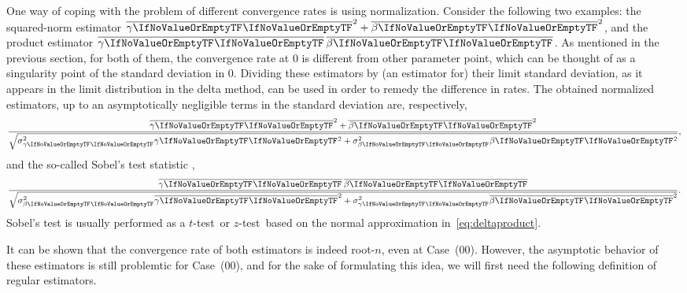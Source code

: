 \documentclass[ejs, twoside]{imsart}
\theoremstyle{plain}
\theoremstyle{remark}
\newcommand{\fullstop}{\text{.}}
\newcommand{\comma}{\text{,}}
\newcommand{\ttest}{\(t\)-test}
\newcommand{\ztest}{\(z\)-test}
\newcommand{\estim}[1]{\avg{\regcoef{#1}}}
\newcommand{\nullcase}[1]{(#1)}
\numberwithin{equation}{section}
\numberwithin{table}{section}
\numberwithin{figure}{section}
\let\originalleft\left
\let\originalright\right
\renewcommand{\left}{\mathopen{}\mathclose\bgroup\originalleft}
\renewcommand{\right}{\aftergroup\egroup\originalright}
\begin{document}
One way of coping with the problem of different convergence rates is using normalization. Consider the following two examples: the squared-norm estimator \( \estim{1}^2 + \estim{2}^2\), and the product estimator \(\product\). As mentioned in the previous section, for both of them, the convergence rate at 0 is different from other parameter point, which can be thought of as a singularity point of the standard deviation in \(0\). Dividing these estimators by (an estimator for) their limit standard deviation, as it appears in the limit distribution in the delta method, can be used in order to remedy the difference in rates.
The obtained normalized estimators, up to an asymptotically negligible terms in the standard deviation are, respectively, \[\frac{ \estim{1}^2 + \estim{2}^2}{\sqrt{\sigma_{\regcoef{1}}^2 \regcoef{1}^2 +  \sigma_{\regcoef{2}}^2 \regcoef{2}^2}} \comma\]
and
the so-called Sobel's test statistic \citep{sobel_asymptotic_1982, mackinnon_comparison_2002, mackinnon_introduction_2012, huang_genome-wide_2019},
\begin{equation} \label{eq:sobel}
\frac{\product}{\sqrt{\sigma_{\regcoef{2}}^2 \estim{1}^2 + \sigma_{\regcoef{1}}^2 \estim{2}^2}} \fullstop
\end{equation}
Sobel's test is usually performed as a \ttest\ or \ztest\, based on the normal approximation in~\eqref{eq:deltaproduct}.

It can be shown that the convergence rate of both estimators is indeed root-\(n\), even at Case~\nullcase{00}. However, the asymptotic behavior of these estimators is still problemtic for Case~\nullcase{00}, and for the sake of formulating this idea, we will first need the following definition of regular estimators.
\end{document}
